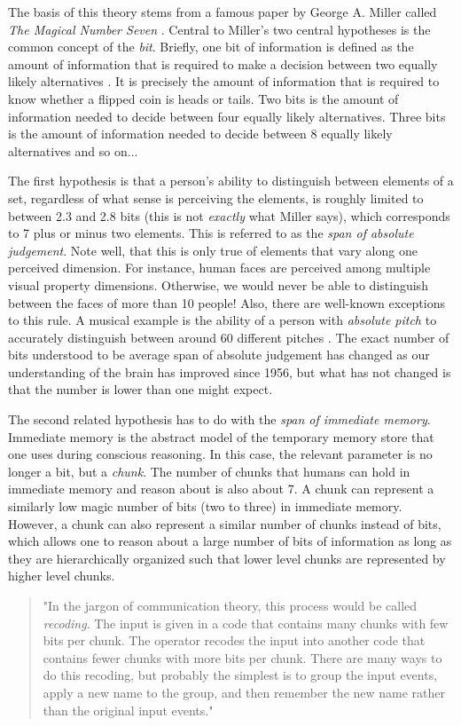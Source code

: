 The basis of this theory stems from a famous paper by George A. Miller called \emph{The Magical Number Seven} \cite{seven1956}. Central to Miller's two central hypotheses is the common concept of the \emph{bit}. Briefly, one bit of information is defined as the amount of information that is required to make a decision between two equally likely alternatives \cite{seven1956}. It is precisely the amount of information that is required to know whether a flipped coin is heads or tails. Two bits is the amount of information needed to decide between four equally likely alternatives. Three bits is the amount of information needed to decide between 8 equally likely alternatives and so on...

The first hypothesis is that a person's ability to distinguish between elements of a set, regardless of what sense is perceiving the elements, is roughly limited to between 2.3 and 2.8 bits (this is not \emph{exactly} what Miller says), which corresponds to 7 plus or minus two elements. This is referred to as the \emph{span of absolute judgement}. Note well, that this is only true of elements that vary along one perceived dimension. For instance, human faces are perceived among multiple visual property dimensions. Otherwise, we would never be able to distinguish between the faces of more than 10 people! Also, there are well-known exceptions to this rule. A musical example is the ability of a person with \emph{absolute pitch} to accurately distinguish between around 60 different pitches \cite{seven1956}. The exact number of bits understood to be average span of absolute judgement has changed as our understanding of the brain has improved since 1956, but what has not changed is that the number is lower than one might expect. 

The second related hypothesis has to do with the \emph{span of immediate memory}. Immediate memory is the abstract model of the temporary memory store that one uses during conscious reasoning. In this case, the relevant parameter is no longer a bit, but a \emph{chunk}. The number of chunks that humans can hold in immediate memory and reason about is also about 7. A chunk can represent a similarly low magic number of bits (two to three) in immediate memory. However, a chunk can also represent a similar number of chunks instead of bits, which allows one to reason about a large number of bits of information as long as they are hierarchically organized such that lower level chunks are represented by higher level chunks.

\begin{quote}
"In the jargon of communication theory, this process would be called \emph{recoding}. The input is given in a code that contains many chunks with few bits per chunk. The operator recodes the input into another code that contains fewer chunks with more bits per chunk. There are many ways to do this recoding, but probably the simplest is to group the input events, apply a new name to the group, and then remember the new name rather than the original input events." \cite{seven1956}
\end{quote}

